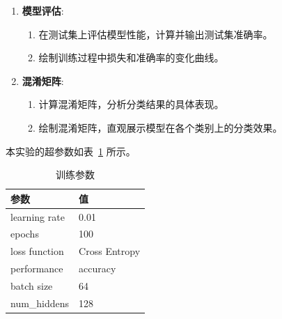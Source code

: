 \documentclass[12pt]{article}
\begin{document}
\begin{enumerate}
  \item \textbf{模型评估}:
        \begin{enumerate}
          \item 在测试集上评估模型性能，计算并输出测试集准确率。
          \item 绘制训练过程中损失和准确率的变化曲线。
        \end{enumerate}

  \item \textbf{混淆矩阵}:
        \begin{enumerate}
          \item 计算混淆矩阵，分析分类结果的具体表现。
          \item 绘制混淆矩阵，直观展示模型在各个类别上的分类效果。
        \end{enumerate}
\end{enumerate}
本实验的超参数如表~\ref{tab:training-params} 所示。
\begin{table}[htbp]
  \centering
  \caption{训练参数}
  \label{tab:training-params}
  \begin{tabular}{m{3cm}<{\centering}m{3cm}<{\centering}}
    \toprule
    \textbf{参数}   & \textbf{值}    \\[\medskipamount]
    \midrule
    learning rate & 0.01          \\[\medskipamount]
    epochs        & 100           \\[\medskipamount]
    loss function & Cross Entropy \\[\medskipamount]
    performance   & accuracy      \\[\medskipamount]
    batch size    & 64            \\[\medskipamount]
    num\_hiddens  & 128           \\[\medskipamount]
    \bottomrule
  \end{tabular}
\end{table}
\end{document}
